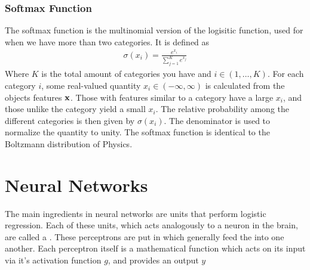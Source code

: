 \subsubsection{Softmax Function}
The softmax function is the multinomial version of the logisitic function, used for when we have more than two categories. It is defined as 
\begin{align}
    \sigma(x_i) = \frac{e^{x_i}}{\sum_{j=1}^K e^{x_j}}
\end{align}
Where $K$ is the total amount of categories you have and $i\in(1,\ldots,K)$. For each category $i$, some real-valued quantity $x_i\in(-\infty,\infty)$ is calculated from the objects features $\textbf{x}$. Those with features similar to a category have a large $x_i$, and those unlike the category yield a small $x_i$. The relative probability among the different categories is then given by $\sigma(x_i)$. The denominator is used to normalize the quantity to unity. The softmax function is identical to the Boltzmann distribution of Physics.



\section{Neural Networks}
The main ingredients in neural networks are units that perform logistic regression. Each of these units, which acts analogously to a neuron in the brain, are called a . These perceptrons are put in  which generally feed the into one another. Each perceptron itself is a mathematical function which acts on its input via it's activation function $g$, and provides an output $y$

